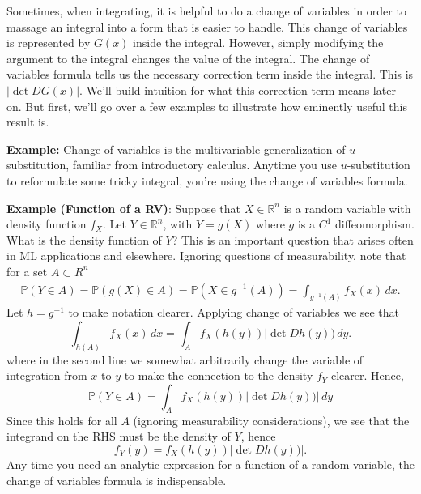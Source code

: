\documentclass{book}
\newcommand{\dx}{\, dx}
\newcommand{\dy}{\, dy}
\newcommand{\R}{\mathbb{R}}
\renewcommand{\P}{\mathbb{P}}
\begin{document}
Sometimes, when integrating, it is helpful to do a change of variables in order to massage an integral into a form that is easier to handle. This change of variables is represented by $G(x)$ inside the integral. However, simply modifying the argument to the integral changes the value of the integral. The change of variables formula tells us the necessary correction term inside the integral. This is $\left| \det DG(x)\right| $. We'll build intuition for what this correction term means later on. But first, we'll go over a few examples to illustrate how eminently useful this result is. 

\vspace{1em}
\noindent 
\textbf{Example:} Change of variables is the multivariable generalization of $u$ substitution, familiar from introductory calculus. Anytime you use $u$-substitution to reformulate some tricky integral, you're using the change of variables formula.  

\vspace{1em} \noindent 
\textbf{Example (Function of a RV)}: Suppose that $X \in \R^n$ is a random variable with density function $f_X$. Let $Y\in \R^n$, with $Y = g(X)$ where $g$ is a $C^1$ diffeomorphism. What is the density function of $Y$? This is an important question that arises often in ML applications and elsewhere. Ignoring questions of measurability, note that for a set $A\subset R^n$ 
\begin{align}
\P(Y \in A) = \P(g(X) \in A) = \P(X \in g^{-1}(A)) = \int_{g^{-1}(A)} f_X(x)\dx. 
\end{align}
Let $h =g^{-1}$ to make notation clearer. Applying change of variables we see that
$$
\int_{h(A)} f_X(x)\dx = \int_A f_X(h(y)) |\det Dh(y))\dy. 
$$
where in the second line we somewhat arbitrarily change the variable of integration from $x$ to $y$ to make the connection to the density $f_Y$ clearer.
Hence,
$$
\P(Y\in A) = \int_A f_X(h(y)) |\det Dh(y))|\dy
$$
Since this holds for all $A$ (ignoring measurability considerations), we see that the integrand on the RHS must be the density of $Y$, hence
\begin{equation} \label{eq:pullbackY} %
f_Y(y) = f_X(h(y)) |\det Dh(y))|.
\end{equation}
Any time you need an analytic expression for a function of a random variable, the change of variables formula is indispensable. 
\end{document}
